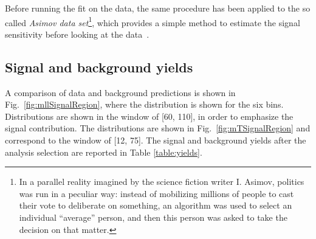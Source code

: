 Before running the fit on the data, the same procedure has been applied to the so called \textit{Asimov data set}\footnote{In a parallel reality imagined by the science fiction writer I. Asimov, politics was run in a peculiar way: instead of mobilizing millions of people to cast their vote to deliberate on something, an algorithm was used to select an individual ``average'' person, and then this person was asked to take the decision on that matter.}, which provides a simple method to estimate the signal sensitivity before looking at the data~\cite{Cowan:2010js}.


\subsection{Signal and background yields}\label{subsec:yields}

A comparison of data and background predictions is shown in Fig.~\ref{fig:mllSignalRegion}, where the \mll{} distribution is shown for the six \pth bins. Distributions are shown in the \mt window of [60, 110]\GeV, in order to emphasize the signal contribution. The \mt distributions are shown in Fig.~\ref{fig:mTSignalRegion} and correspond to the \mll window of [12, 75]\GeV. The signal and background yields after the analysis selection are reported in Table \ref{table:yields}.

